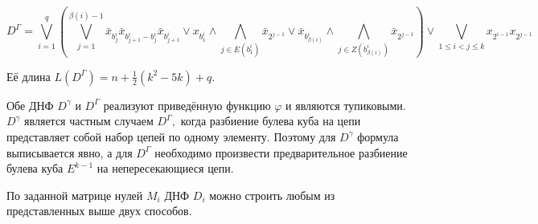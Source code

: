 \documentclass[12pt,a4paper,oneside,fleqn,leqno]{article}
\theoremstyle{definition}
\begin{document}
			$$
				D^{\Gamma} = \bigvee_{i = 1}^q \left(\bigvee_{j = 1}^{\beta(i) - 1} \bar{x}_{b_j^i} \bar{x}_{b_{j + 1}^i - b_j^i} \bar{x}_{b_{j + 1}^i} \vee x_{b_1^i} \wedge \bigwedge_{j \in E(b_1^i)}\bar{x}_{2^{j - 1}} \vee \bar{x}_{b^i_{\beta(i)}} \wedge \bigwedge_{j \in Z(b^i_{\beta(i)})}\bar{x}_{2^{j - 1}} \right)
				 \vee \bigvee_{1 \leqslant i < j \leqslant k} x_{2^{i - 1}} x_{2^{j - 1}}
			$$\par
			Её длина $L(D^{\Gamma}) = n + \frac{1}{2}(k^2 - 5k) + q.$\par
			Обе ДНФ $D^{\gamma}$ и $D^{\Gamma}$ реализуют приведённую функцию $\varphi$ и являются тупиковыми. $D^{\gamma}$ является частным случаем $D^{\Gamma},$ когда разбиение булева куба на цепи представляет собой набор цепей по одному элементу. Поэтому для $D^{\gamma}$ формула выписывается явно, а для $D^{\Gamma}$ необходимо произвести предварительное разбиение булева куба $E^{k - 1}$ на непересекающиеся цепи.\par
			По заданной матрице нулей $M_i$ ДНФ $D_i$ можно строить любым из представленных выше двух способов. 
\end{document}
